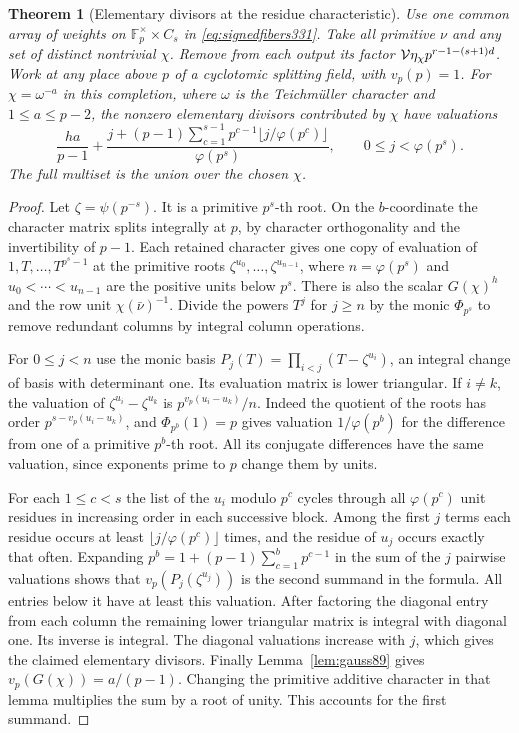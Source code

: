 \documentclass[a4paper,11pt]{article}
\newtheorem{theorem}[proposition]{Theorem}
\theoremstyle{definition}
\theoremstyle{remark}
\numberwithin{equation}{section}
\begin{document}
\begin{theorem}[Elementary divisors at the residue characteristic]\leavevmode
\label{thm:localsmith331}
Use one common array of weights on \(\mathbb F_p^\times\times C_s\)
in \eqref{eq:signedfibers331}. Take all primitive \(\nu\) and any
set of distinct nontrivial \(\chi\). Remove from each output its
factor \({\cal V}\eta_\chi p^{r-1-(s+1)d}\). Work at any place
above \(p\) of a cyclotomic splitting field, with \(v_p(p)=1\).
For \(\chi=\omega^{-a}\) in this completion, where \(\omega\) is
the Teichm\"uller character and \(1\le a\le p-2\), the nonzero
elementary divisors contributed by \(\chi\) have valuations
\[
 \frac{ha}{p-1}+
 \frac{j+(p-1)\displaystyle\sum_{c=1}^{s-1}
      p^{c-1}\lfloor j/\varphi(p^c)\rfloor}{\varphi(p^s)},
 \qquad 0\le j<\varphi(p^s).
\]
The full multiset is the union over the chosen \(\chi\).
\end{theorem}
\begin{proof}
Let \(\zeta=\psi(p^{-s})\). It is a primitive \(p^s\)-th root.
On the \(b\)-coordinate the character matrix splits integrally
at \(p\), by character orthogonality and the invertibility of
\(p-1\). Each retained character gives one copy of evaluation of
\(1,T,\ldots,T^{p^s-1}\) at the primitive roots
\(\zeta^{u_0},\ldots,\zeta^{u_{n-1}}\), where \(n=\varphi(p^s)\)
and \(u_0<\cdots<u_{n-1}\) are the positive units below \(p^s\).
There is also the scalar \(G(\chi)^h\) and the row unit
\(\chi(\bar\nu)^{-1}\). Divide the powers \(T^j\) for \(j\ge n\)
by the monic \(\Phi_{p^s}\) to remove redundant columns by integral
column operations.

For \(0\le j<n\) use the monic basis
\(P_j(T)=\prod_{i<j}(T-\zeta^{u_i})\), an integral change of
basis with determinant one. Its evaluation matrix is lower triangular.
If \(i\ne k\), the valuation of \(\zeta^{u_i}-\zeta^{u_k}\) is
\(p^{v_p(u_i-u_k)}/n\). Indeed the quotient of the roots has
order \(p^{s-v_p(u_i-u_k)}\), and
\(\Phi_{p^b}(1)=p\) gives valuation \(1/\varphi(p^b)\) for the
difference from one of a primitive \(p^b\)-th root. All its
conjugate differences have the same valuation, since exponents
prime to \(p\) change them by units.

For each \(1\le c<s\) the list of the \(u_i\) modulo \(p^c\)
cycles through all \(\varphi(p^c)\) unit residues in increasing
order in each successive block. Among the first \(j\) terms each
residue occurs at least \(\lfloor j/\varphi(p^c)\rfloor\) times,
and the residue of \(u_j\) occurs exactly that often. Expanding
\(p^b=1+(p-1)\sum_{c=1}^{b}p^{c-1}\) in the sum of the \(j\)
pairwise valuations shows that \(v_p(P_j(\zeta^{u_j}))\) is
the second summand in the formula. All entries below it have
at least this valuation. After factoring the diagonal entry from
each column the remaining lower triangular matrix is integral with
diagonal one. Its inverse is integral. The diagonal valuations
increase with \(j\), which gives the claimed elementary divisors.
Finally Lemma~\ref{lem:gauss89} gives \(v_p(G(\chi))=a/(p-1)\).
Changing the primitive additive character in that lemma multiplies
the sum by a root of unity. This accounts for the first summand.
\end{proof}
\end{document}

